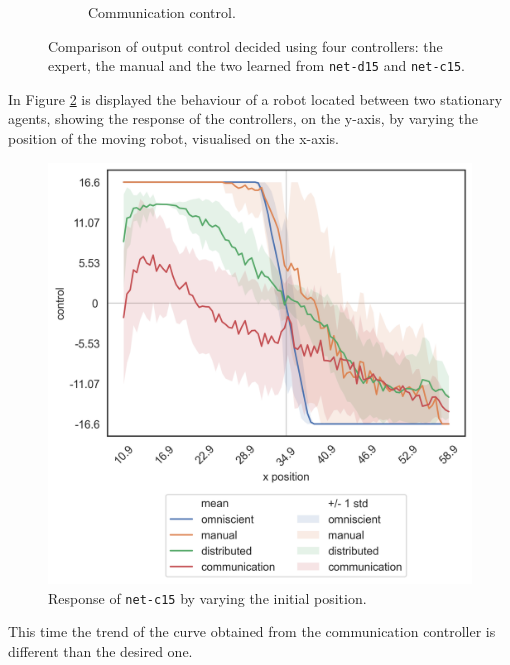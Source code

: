 \begin{figure}[H]
\begin{center}
\begin{subfigure}[h]{0.35\textwidth}
			\caption{Communication control.}
		\end{subfigure}
	\end{center}
	\vspace{-0.5cm}
	\caption[Evaluation of the control decided by \texttt{net-c15}.]{Comparison of 
	output control decided using four controllers: the expert, the manual and the 
	two learned from \texttt{net-d15} and \texttt{net-c15}.}
	\label{fig:net-c15control}
\end{figure}

In Figure \ref{fig:net-c15responseposition} is displayed the behaviour of a robot 
located between two stationary agents, showing the response of the controllers, 
on the y-axis, by varying the position of the moving robot, visualised on the 
x-axis.  
\begin{figure}[!htb]
	\centering
	\includegraphics[width=.45\textwidth]{contents/images/net-c15/response-varying_init_position-communication}%
	\caption{Response of \texttt{net-c15} by varying the initial position.}
	\label{fig:net-c15responseposition}
\end{figure}
This time the trend of the curve obtained from the communication controller is 
different than the desired one.

